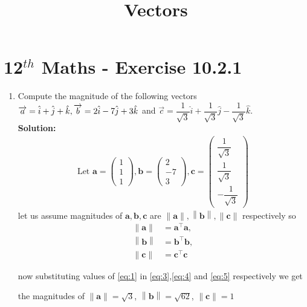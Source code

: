 \documentclass[12pt]{article}
\providecommand{\norm}[1]{\left\lVert#1\right\rVert}
\newcommand{\solution}{\noindent \textbf{Solution: }}
\newcommand{\myvec}[1]{\ensuremath{\begin{pmatrix}#1\end{pmatrix}}}
\let\vec\mathbf
\begin{document}
\begin{center}
\title{\textbf{Vectors}}
\date{\vspace{-5ex}} %
\maketitle
\end{center}
\setcounter{page}{1}
\section*{12$^{th}$ Maths - Exercise 10.2.1}

\begin{enumerate}
\item Compute the magnitude of the following vectors 
$\\ \overrightarrow{a}=\hat{i}+\hat{j}+\hat{k},\overrightarrow{b}=2\hat{i}-7\hat{j}+3\hat{k}$ and $\overrightarrow{c}=\dfrac{1}{\sqrt{3}}\hat{i}+\dfrac{1}{\sqrt{3}}\hat{j}-\dfrac{1}{\sqrt{3}}\hat{k}$.\\
\solution
\begin{align}
\text{Let } \vec{a} = \myvec{1\\1\\1} , \vec{b} = \myvec{2\\ -7 \\ 3},\vec{c} = \myvec{\dfrac{1}{\sqrt{3}}\\ \dfrac{1}{\sqrt{3}} \\ -\dfrac{1}{\sqrt{3}}} 
\label{eq:1}
\end{align}
let us assume magnitudes of $\vec{a},\vec{b},\vec{c}$ are $\norm{\vec{a}},\norm{\vec{b}},\norm{\vec{c}}$ respectively
so
\begin{align}
	\norm{\vec{a}}&={\vec{a}}^{\top}\vec{a}, 
	\label{eq:3}
	\\ \norm{\vec{b}}&={\vec{b}}^{\top}\vec{b}, 
	\label{eq:4}
	\\ \norm{\vec{c}}&={\vec{c}}^{\top}\vec{c}	
	\label{eq:5}
\end{align}

now substituting values of \eqref{eq:1} in \eqref{eq:3},\eqref{eq:4} and \eqref{eq:5} respectively we get

the magnitudes of $\norm{\vec{a}}=\sqrt{3}$, $\norm{\vec{b}}= \sqrt{62}$, $\norm{\vec{c}}=1$

\end{enumerate}
\end{document}
